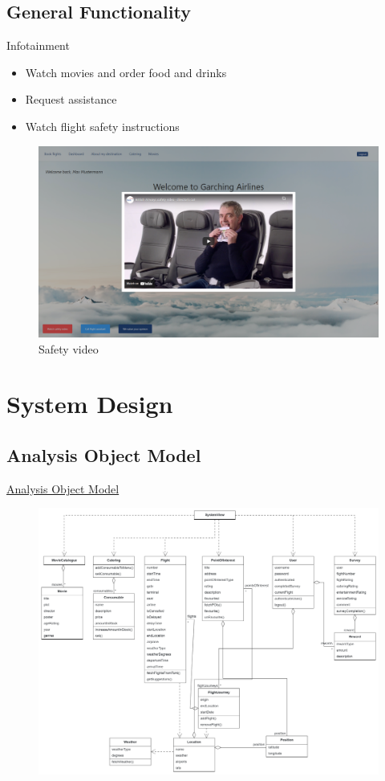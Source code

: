 \documentclass{beamer}
\begin{document}
\subsection{General Functionality}
\begin{frame}{Infotainment}
	\begin{itemize}
		\item Watch movies and order food and drinks
		\item Request assistance
		\item Watch flight safety instructions
	\end{itemize}
	\begin{figure}
		\includegraphics[width=.8\textwidth]{../images/SafetyVideo.png}
		\caption{Safety video}
	\end{figure}
\end{frame}
\section{System Design}
\subsection{Analysis Object Model}
\begin{frame}{\href{run:../images/ObjectDiagram.png}{Analysis Object Model}}
	\begin{figure}
		\includegraphics[width=.8\textwidth]{../images/ObjectDiagram.png}
	\end{figure}
\end{frame}
\end{document}
